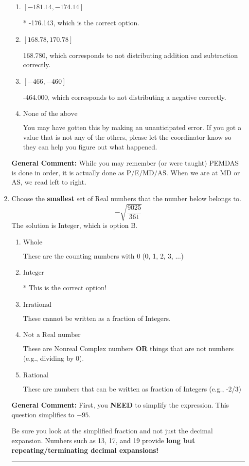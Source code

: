 \documentclass{extbook}[14pt]
\newcommand{\litem}[1]{\item #1

\rule{\textwidth}{0.4pt}}
\begin{document}
\begin{enumerate}
{\begin{enumerate}[label=\Alph*.]
 -139.220, which corresponds to an Order of Operations error: not reading left-to-right for multiplication/division.
\item \( [-181.14, -174.14] \)

* -176.143, which is the correct option.
\item \( [168.78, 170.78] \)

 168.780, which corresponds to not distributing addition and subtraction correctly.
\item \( [-466, -460] \)

 -464.000, which corresponds to not distributing a negative correctly.
\item \( \text{None of the above} \)

 You may have gotten this by making an unanticipated error. If you got a value that is not any of the others, please let the coordinator know so they can help you figure out what happened.
\end{enumerate}

\textbf{General Comment:} While you may remember (or were taught) PEMDAS is done in order, it is actually done as P/E/MD/AS. When we are at MD or AS, we read left to right.
}
\litem{
Choose the \textbf{smallest} set of Real numbers that the number below belongs to.
\[ -\sqrt{\frac{9025}{361}} \]The solution is \( \text{Integer} \), which is option B.\begin{enumerate}[label=\Alph*.]
\item \( \text{Whole} \)

These are the counting numbers with 0 (0, 1, 2, 3, ...)
\item \( \text{Integer} \)

* This is the correct option!
\item \( \text{Irrational} \)

These cannot be written as a fraction of Integers.
\item \( \text{Not a Real number} \)

These are Nonreal Complex numbers \textbf{OR} things that are not numbers (e.g., dividing by 0).
\item \( \text{Rational} \)

These are numbers that can be written as fraction of Integers (e.g., -2/3)
\end{enumerate}

\textbf{General Comment:} First, you \textbf{NEED} to simplify the expression. This question simplifies to $-95$. 
 
 Be sure you look at the simplified fraction and not just the decimal expansion. Numbers such as 13, 17, and 19 provide \textbf{long but repeating/terminating decimal expansions!} 
 
}
\end{enumerate}
\end{document}
